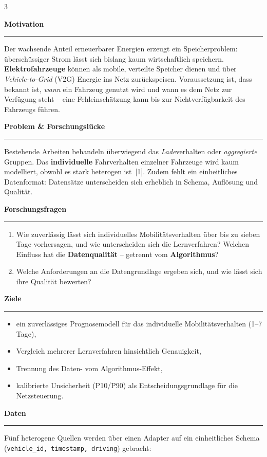 \documentclass[10pt]{scrartcl}
\newcommand{\poster}[1]{%
  \vspace{0.10em}%
  {\color{heblue}\large\bfseries #1}\par\nobreak
  {\color{heblue}\rule{\linewidth}{1.2pt}}\par\nobreak\vspace{0.25em}}
\begin{document}
\begin{multicols}{3}
\raggedcolumns

\poster{Motivation}
Der wachsende Anteil erneuerbarer Energien erzeugt ein Speicherproblem:
überschüssiger Strom lässt sich bislang kaum wirtschaftlich speichern.
\textbf{Elektrofahrzeuge} können als mobile, verteilte Speicher dienen und
über \emph{Vehicle-to-Grid} (V2G) Energie ins Netz zurückspeisen. Voraussetzung
ist, dass bekannt ist, \emph{wann} ein Fahrzeug genutzt wird und wann es dem Netz zur Verfügung steht -- eine Fehleinschätzung kann bis zur Nichtverfügbarkeit des Fahrzeugs führen.

\poster{Problem \& Forschungslücke}
Bestehende Arbeiten behandeln überwiegend das \emph{Lade}verhalten oder
\emph{aggregierte} Gruppen. Das \textbf{individuelle} Fahrverhalten einzelner
Fahrzeuge wird kaum modelliert, obwohl es stark heterogen ist~[1]. Zudem fehlt ein einheitliches Datenformat: Datensätze unterscheiden sich erheblich in Schema, Auflösung und Qualität.

\poster{Forschungsfragen}
\begin{enumerate}[leftmargin=1.3em,itemsep=0.15em,topsep=0.1em]
  \item Wie zuverlässig lässt sich individuelles Mobilitätsverhalten über bis
        zu sieben Tage vorhersagen, und wie unterscheiden sich die Lernverfahren?
        Welchen Einfluss hat die \textbf{Datenqualität} -- getrennt vom \textbf{Algorithmus}?
  \item Welche Anforderungen an die Datengrundlage ergeben sich, und wie lässt sich ihre Qualität bewerten?
\end{enumerate}

\poster{Ziele}
\begin{itemize}[leftmargin=1.2em,itemsep=0.12em,topsep=0.1em]
  \item ein zuverlässiges Prognosemodell für das individuelle Mobilitätsverhalten (1--7 Tage),
  \item Vergleich mehrerer Lernverfahren hinsichtlich Genauigkeit,
  \item Trennung des Daten- vom Algorithmus-Effekt,
  \item kalibrierte Unsicherheit (P10/P90) als Entscheidungsgrundlage für die Netzsteuerung.
\end{itemize}

\poster{Daten}
Fünf heterogene Quellen werden über einen Adapter auf ein einheitliches Schema (\texttt{vehicle\_id, timestamp, driving}) gebracht:


\end{multicols}
\end{document}
